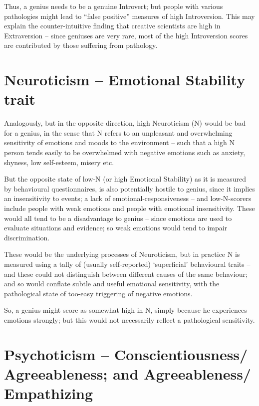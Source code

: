 \documentclass[
]{book}
\begin{document}
Thus, a genius needs to be a genuine Introvert; but people with various pathologies might lead to ``false positive'' measures of high Introversion. This may explain the counter-intuitive finding that creative scientists are high in Extraversion -- since geniuses are very rare, most of the high Introversion scores are contributed by those suffering from pathology.

\hypertarget{neuroticism-emotional-stability-trait}{%
\section{Neuroticism -- Emotional Stability trait}\label{neuroticism-emotional-stability-trait}}

Analogously, but in the opposite direction, high Neuroticism (N) would be bad for a genius, in the sense that N refers to an unpleasant and overwhelming sensitivity of emotions and moods to the environment -- such that a high N person tends easily to be overwhelmed with negative emotions such as anxiety, shyness, low self-esteem, misery etc.

But the opposite state of low-N (or high Emotional Stability) as it is measured by behavioural questionnaires, is also potentially hostile to genius, since it implies an insensitivity to events; a lack of emotional-responsiveness -- and low-N-scorers include people with weak emotions and people with emotional insensitivity. These would all tend to be a disadvantage to genius -- since emotions are used to evaluate situations and evidence; so weak emotions would tend to impair discrimination.

These would be the underlying processes of Neuroticism, but in practice N is measured using a tally of (usually self-reported) `superficial' behavioural traits -- and these could not distinguish between different causes of the same behaviour; and so would conflate subtle and useful emotional sensitivity, with the pathological state of too-easy triggering of negative emotions.

So, a genius might score as somewhat high in N, simply because he experiences emotions strongly; but this would not necessarily reflect a pathological sensitivity.

\hypertarget{psychoticism-conscientiousness-agreeableness-and-agreeableness-empathizing}{%
\section{Psychoticism -- Conscientiousness/ Agreeableness; and Agreeableness/ Empathizing}\label{psychoticism-conscientiousness-agreeableness-and-agreeableness-empathizing}}
\end{document}
